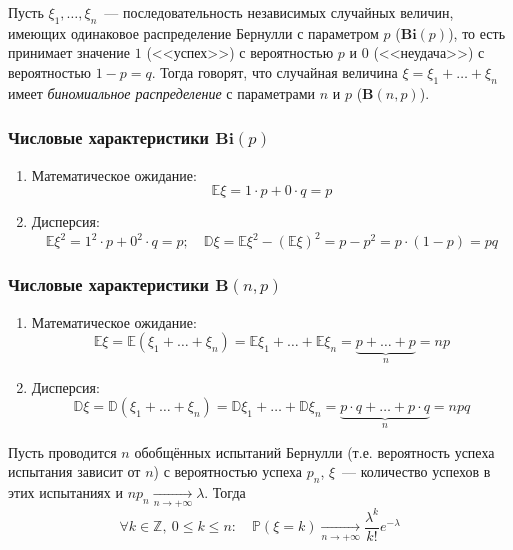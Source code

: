 \begin{defn}
    Пусть $\xi_1, \ldots, \xi_n$~--- последовательность независимых случайных величин, имеющих одинаковое распределение Бернулли с параметром $p$ ($\mathbf{Bi}(p)$), то есть принимает значение $1$ (<<успех>>) с вероятностью $p$ и $0$ (<<неудача>>) с вероятностью $1 - p = q$. Тогда говорят, что случайная величина $\xi = \xi_1 + \ldots + \xi_n$ имеет {\it биномиальное распределение} с параметрами $n$ и $p$ ($\mathbf{B}(n, p)$).
\end{defn}

\subsubsection{Числовые характеристики $\mathbf{Bi}(p)$}
\begin{enumerate}
    \item Математическое ожидание:
    \begin{equation*}
        \mathbb{E}\xi =  1 \cdot p + 0 \cdot q = p
    \end{equation*}
    \item Дисперсия:
        $$\mathbb{E}\xi^2 = 1^2 \cdot p + 0^2 \cdot q = p; \quad \mathbb{D}\xi = \mathbb{E}\xi^2 - (\mathbb{E}\xi)^2 = p - p^2 = p \cdot (1 - p) = pq$$
\end{enumerate}

\subsubsection{Числовые характеристики $\mathbf{B}(n, p)$}
\begin{enumerate}
    \item Математическое ожидание:
    \begin{equation*}
        \mathbb{E}\xi = \mathbb{E}(\xi_1 + \ldots + \xi_n) = \mathbb{E}\xi_1 + \ldots + \mathbb{E}\xi_n = \underbrace{p + \ldots + p}_{n} = np
    \end{equation*}
    \item Дисперсия:
    \begin{equation*}
        \mathbb{D}\xi = \mathbb{D}(\xi_1 + \ldots + \xi_n) = \mathbb{D}\xi_1 + \ldots + \mathbb{D}\xi_n = \underbrace{p \cdot q + \ldots + p \cdot q}_{n} = npq
    \end{equation*}
\end{enumerate}

\begin{namedthm}
    Пусть проводится $n$ обобщённых испытаний Бернулли (т.е. вероятность успеха испытания зависит от $n$) с вероятностью успеха $p_n$, $\xi$~--- количество успехов в этих испытаниях и $n p_{n} \underset{n \to +\infty}{\longrightarrow} \lambda$. Тогда
    \begin{equation*}
        \forall k \in \mathbb{Z},~ 0 \leqslant k \leqslant n: \quad \mathbb{P}\left(\xi=k\right) \underset{n \to +\infty}{\longrightarrow} \frac{\lambda^{k}}{k !} e^{-\lambda}
    \end{equation*}
\end{namedthm}


